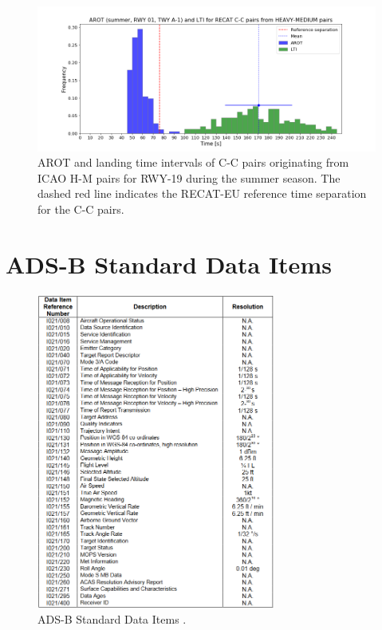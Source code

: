 \begin{figure}[h]
    \centering
    \includegraphics[width=1.0\textwidth]{graphics/fig_best_CC_from_HM_pairs_time_sep.png}
    \caption[AROT and LTI of C-C pairs from ICAO H-M pairs on RWY~19]{AROT and landing time intervals of C-C pairs originating from ICAO H-M pairs for RWY-19 during the summer season. The dashed red line indicates the RECAT-EU reference time separation for the C-C pairs.}
    \label{fig:best_CC_from_HM_pairs_time_sep}
\end{figure}


\clearpage
\chapter{ADS-B Standard Data Items}\label{app:adsb_items}

\begin{figure}[h]
    \centering
    \includegraphics[width=0.7\textwidth]{graphics/ads_b_items.png}
    \caption[ADS-B Standard Data Items]{ADS-B Standard Data Items \cite[p. 8]{ASTERIX_ADS-B_specs}.}
    \label{fig:adsb_items}
\end{figure}


